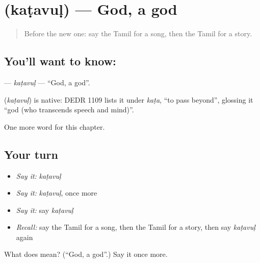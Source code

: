 \section[\texorpdfstring{\ta{கடவுள்} (kaṭavuḷ)}{கடவுள் (kaṭavuḷ)}]{ (kaṭavuḷ) — God, a god}

\label{lesson:TA-C274-katavul}



\begin{quote}
Before the new one: say the Tamil for a song, then the Tamil for a story.
\end{quote}

\subsection*{You'll want to know: }
\textbf{} — \emph{kaṭavuḷ} — \textquotedblleft{}God, a god\textquotedblright{}.

\begin{cousinweb}
\textbf{} (\emph{kaṭavuḷ}) is native: DEDR 1109 lists it under \emph{kaṭa}, \textquotedblleft{}to pass beyond\textquotedblright{}, glossing it \textquotedblleft{}god (who transcends speech and mind)\textquotedblright{}.
\end{cousinweb}

\begin{grammarlens}[title={What you've built}]
One more word for this chapter.
\end{grammarlens}

\subsection*{Your turn}
\begin{itemize}
\raggedright
  \item \emph{Say it:} \emph{kaṭavuḷ}
  \item \emph{Say it:} \emph{kaṭavuḷ}, once more
  \item \emph{Say it:} say \emph{kaṭavuḷ}
  \item \emph{Recall:} say the Tamil for a song, then the Tamil for a story, then say \emph{kaṭavuḷ} again
\end{itemize}

\begin{tcolorbox}[breakable,colback=teal!4,colframe=teal!35!black,title={Before you move on}]
What does  mean? (\textquotedblleft{}God, a god\textquotedblright{}.) Say it once more.
\end{tcolorbox}
